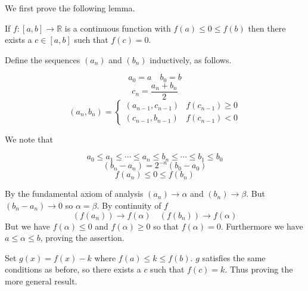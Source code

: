 \documentclass[12pt]{article}
\begin{document}
We first prove the following lemma.

If $f:[a,b] \to \mathbb{R}$ is a continuous function with $f(a) \le 0 \le f(b)$ then there exists a $c \in [a,b]$ such that $f(c) = 0$.

Define the sequences $(a_n)$ and $(b_n)$ inductively, as follows.

$$a_0 = a \quad b_0 = b$$
$$c_n = \frac{a_n + b_n}{2}$$
$$(a_n, b_n) = \begin{cases} (a_{n-1}, c_{n-1}) & f(c_{n-1}) \ge 0 \\			(c_{n-1}, b_{n-1}) & f(c_{n-1}) < 0  \end{cases}$$

We note that

$$ a_0 \le a_1 \le \cdots \le a_n \le b_n \le \cdots \le b_1 \le b_0 $$
\begin{equation} (b_n - a_n) = 2^{-n}(b_0 - a_0) \end{equation}
\begin{equation} \label{eqn} f(a_n) \le 0 \le f(b_n) \end{equation}

By the fundamental axiom of analysis $(a_n) \to \alpha$ and $(b_n) \to \beta$. But $(b_n - a_n) \to 0$ so $\alpha = \beta$.
By continuity of $f$
$$(f(a_n)) \to f(\alpha) \quad (f(b_n)) \to f(\alpha)$$
But we have $f(\alpha) \le 0$ and $f(\alpha) \ge 0$ so that $f(\alpha) = 0$. Furthermore we have $a \le \alpha \le b$, proving the assertion.

Set $g(x) = f(x) - k$ where $f(a) \le k \le f(b)$. $g$ satisfies the same conditions as before, so there exists a $c$ such that $f(c) = k$. Thus proving the more general result.
\end{document}
